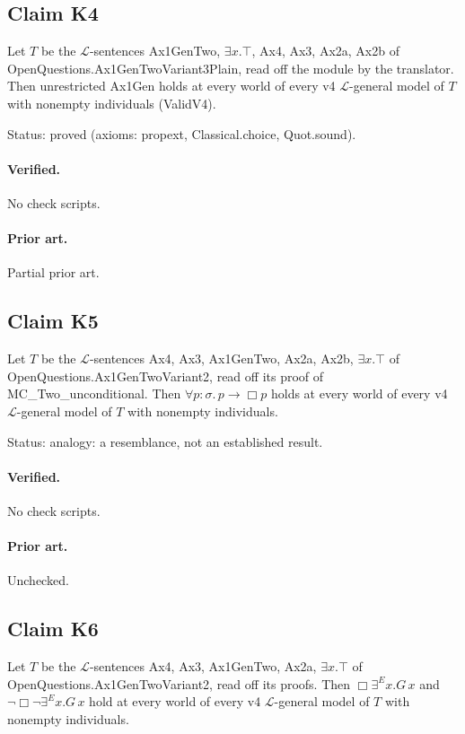 \documentclass{article}
\begin{document}
\subsection*{Claim K4}

Let $T$ be the $\mathcal L$-sentences Ax1GenTwo, $\exists x.\top$, Ax4, Ax3, Ax2a, Ax2b of OpenQuestions.Ax1GenTwoVariant3Plain, read off the module by the translator. Then unrestricted Ax1Gen holds at every world of every v4 $\mathcal L$-general model of $T$ with nonempty individuals (ValidV4).

Status: proved (axioms: propext, Classical.choice, Quot.sound).

\paragraph{Verified.}
No check scripts.

\paragraph{Prior art.} Partial prior art.

\subsection*{Claim K5}

Let $T$ be the $\mathcal L$-sentences Ax4, Ax3, Ax1GenTwo, Ax2a, Ax2b, $\exists x.\top$ of OpenQuestions.Ax1GenTwoVariant2, read off its proof of MC\_Two\_unconditional. Then $\forall p{:}\sigma.\,p\to\Box p$ holds at every world of every v4 $\mathcal L$-general model of $T$ with nonempty individuals.

Status: analogy: a resemblance, not an established result.

\paragraph{Verified.}
No check scripts.

\paragraph{Prior art.} Unchecked.

\subsection*{Claim K6}

Let $T$ be the $\mathcal L$-sentences Ax4, Ax3, Ax1GenTwo, Ax2a, $\exists x.\top$ of OpenQuestions.Ax1GenTwoVariant2, read off its proofs. Then $\Box\exists^E x.G\,x$ and $\neg\Box\neg\exists^E x.G\,x$ hold at every world of every v4 $\mathcal L$-general model of $T$ with nonempty individuals.
\end{document}
